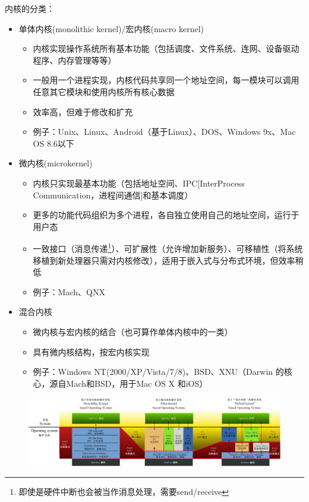 内核的分类：
\begin{itemize}
	\item 单体内核(monolithic kernel)/宏内核(macro kernel)
	\begin{itemize}
		\item 内核实现操作系统所有基本功能（包括调度、文件系统、连网、设备驱动程序、内存管理等等）
		\item 一般用一个进程实现，内核代码共享同一个地址空间，每一模块可以调用任意其它模块和使用内核所有核心数据
		\item 效率高，但难于修改和扩充
		\item 例子：Unix、Linux、Android（基于Linux）、DOS、Windows 9x、Mac OS 8.6以下
	\end{itemize}
	\item 微内核(microkernel)
	\begin{itemize}
		\item 内核只实现最基本功能（包括地址空间、IPC[InterProcess Communication，进程间通信]和基本调度）
		\item 更多的功能代码组织为多个进程，各自独立使用自己的地址空间，运行于用户态
		\item 一致接口（消息传递\footnote{即使是硬件中断也会被当作消息处理，需要send/receive}）、可扩展性（允许增加新服务）、可移植性（将系统移植到新处理器只需对内核修改），适用于嵌入式与分布式环境，但效率稍低
		\item 例子：Mach、QNX
	\end{itemize}
	\item 混合内核
	\begin{itemize}
		\item 微内核与宏内核的结合（也可算作单体内核中的一类）
		\item 具有微内核结构，按宏内核实现
		\item 例子：Windows NT(2000/XP/Vista/7/8)、BSD、XNU（Darwin 的核心，源自Mach和BSD，用于Mac OS X 和iOS）
	\end{itemize}
\end{itemize}
\begin{figure}[H]
	\centering
	\includegraphics[width=\linewidth]{fig/kernels.png}
\end{figure}